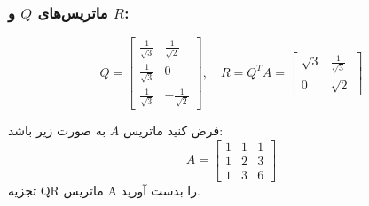 \subsubsection*{ماتریس‌های \( Q \) و \( R \):}
\[
Q = \begin{bmatrix}
	\frac{1}{\sqrt{3}} & \frac{1}{\sqrt{2}} \\
	\frac{1}{\sqrt{3}} & 0 \\
	\frac{1}{\sqrt{3}} & -\frac{1}{\sqrt{2}}
\end{bmatrix}, \quad
R = Q^T A = \begin{bmatrix}
	\sqrt{3} & \frac{1}{\sqrt{3}} \\
	0 & \sqrt{2}
\end{bmatrix}
\]
\begin{example}
	
	فرض کنید ماتریس \( A \) به صورت زیر باشد:
	\[
	A = \begin{bmatrix}
		1 & 1 & 1 \\
		1 & 2 & 3 \\
		1 & 3 & 6
	\end{bmatrix}
	\]
	تجزیه QR ماتریس A  را بدست آورید.
\end{example}
